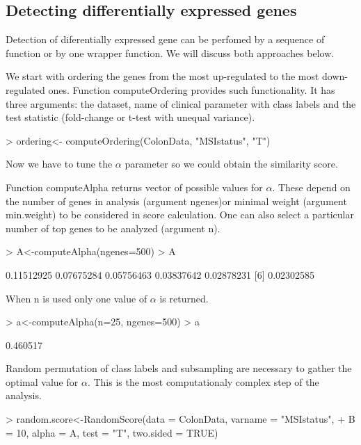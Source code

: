 \documentclass[a4paper]{report}
\begin{document}
\subsection*{Detecting differentially expressed genes}
Detection of diferentially expressed gene can be perfomed by a sequence of function or by one wrapper function. We will discuss both approaches below.\par
We start with ordering the genes from the most up-regulated to the most down-regulated ones. Function {\ttfamily computeOrdering} provides such functionality. It has three arguments: the dataset, name of clinical parameter with class labels and the test statistic (fold-change or t-test with unequal variance).
\begin{Schunk}
\begin{Sinput}
> ordering<- computeOrdering(ColonData, "MSIstatus", "T")
\end{Sinput}
\end{Schunk}
Now we have to tune the $\alpha$ parameter so we could obtain the similarity score.\par
Function {\ttfamily computeAlpha} returns vector of possible values for $\alpha$. These depend on the number of genes in analysis (argument {\ttfamily ngenes})or minimal weight (argument {\ttfamily min.weight}) to be considered in score calculation. One can also select a particular number of top genes to be analyzed (argument {\ttfamily n}). 
\begin{Schunk}
\begin{Sinput}
> A<-computeAlpha(ngenes=500)
> A
\end{Sinput}
\begin{Soutput}
[1] 0.11512925 0.07675284 0.05756463 0.03837642 0.02878231
[6] 0.02302585
\end{Soutput}
\end{Schunk}
When {\ttfamily n} is used only one value of $\alpha$ is returned.
\begin{Schunk}
\begin{Sinput}
> a<-computeAlpha(n=25, ngenes=500)
> a
\end{Sinput}
\begin{Soutput}
[1] 0.460517
\end{Soutput}
\end{Schunk}
Random permutation of class labels and subsampling are necessary to gather the optimal value for $\alpha$. This is the most computationaly complex step of the analysis. 
\begin{Schunk}
\begin{Sinput}
> random.score<-RandomScore(data = ColonData, varname = "MSIstatus", 
+ B = 10, alpha = A, test = "T",  two.sided = TRUE)
\end{Sinput}
\end{Schunk}
\end{document}
